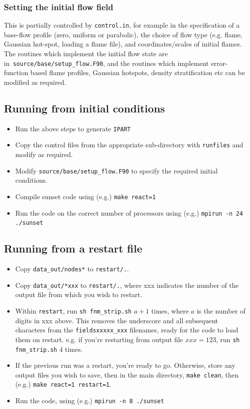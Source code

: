 \documentclass[notitlepage]{revtex4-1}
\begin{document}
\subsubsection{Setting the initial flow field}

This is partially controlled by \verb|control.in|, for example in the specification of a base-flow profile (zero, uniform or parabolic), the choice of flow type (e.g. flame, Gaussian hot-spot, loading a flame file), and coordinates/scales of initial flames. The routines which implement the initial flow state are in~\verb|source/base/setup_flow.F90|, and the routines which implement error-function based flame profiles, Gaussian hotspots, density stratification etc can be modified as required.

\subsection{Running from initial conditions}

\begin{itemize}
\item Run the above steps to generate \verb|IPART|
\item Copy the control files from the appropriate sub-directory with \verb|runfiles| and modify as required.
\item Modify \verb|source/base/setup_flow.F90| to specify the required initial conditions.
\item Compile sunset code using (e.g.) \verb|make react=1|
\item Run the code on the correct number of processors using (e.g.) \verb|mpirun -n 24 ./sunset|
\end{itemize}

\subsection{Running from a restart file}

\begin{itemize}
\item Copy \verb|data_out/nodes*| to \verb|restart/.|.
\item Copy \verb|data_out/*xxx| to \verb|restart/.|, where xxx indicates the number of the output file from which you wish to restart.
\item Within \verb|restart|, run \verb|sh fnm_strip.sh| $a+1$ times, where $a$ is the number of digits in xxx above. This removes the underscore and all subsequent characters from the \verb|fieldsxxxxx_xxx| filenames, ready for the code to load them on restart. e.g. if you're restarting from output file $xxx=123$, run \verb|sh fnm_strip.sh| $4$ times. 
\item If the previous run was a restart, you're ready to go. Otherwise, store any output files you wish to save, then in the main directory, \verb|make clean|, then (e.g.) \verb|make react=1 restart=1|.
\item Run the code, using (e.g.) \verb|mpirun -n 8 ./sunset|
\end{itemize}
\end{document}
